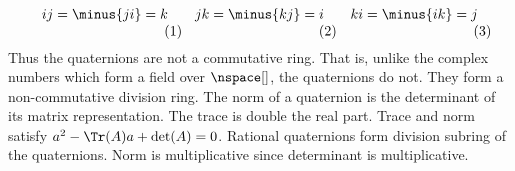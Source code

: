            \par
            \begin{subequations}
                \begin{minipage}[b]{0.32\textwidth}
                    \centering
                    \begin{equation}
                        ij=\minus{ji}=k
                    \end{equation}
                \end{minipage}
                \hfill
                \begin{minipage}[b]{0.32\textwidth}
                    \centering
                    \begin{equation}
                        jk=\minus{kj}=i
                    \end{equation}
                \end{minipage}
                \hfill
                \begin{minipage}[b]{0.32\textwidth}
                    \centering
                    \begin{equation}
                        ki=\minus{ik}=j
                    \end{equation}
                \end{minipage}
            \end{subequations}
            Thus the quaternions are not a commutative ring. That is, unlike
            the complex numbers which form a field over $\nspace[]$, the
            quaternions do not. They form a non-commutative division ring.
            The norm of a quaternion is the determinant of its matrix
            representation. The trace is double the real part. Trace and
            norm satisfy $a^{2}-\Tr(A)a+\det(A)=0$. Rational quaternions
            form division subring of the quaternions. Norm is multiplicative
            since determinant is multiplicative.
